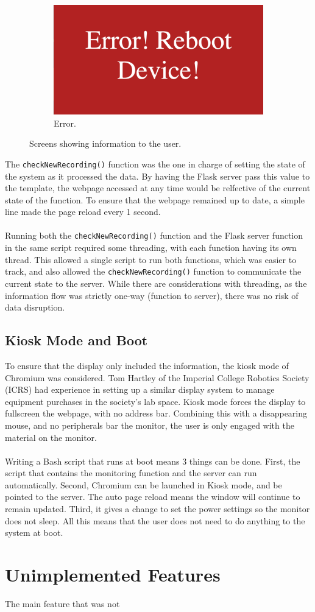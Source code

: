 \documentclass[main.tex]{subfiles}
\begin{document}
\begin{figure}[H]
\begin{subfigure}{0.45\textwidth}
				\includegraphics[width=\textwidth]{pics/state9}
				\caption{Error.}
				\label{fig:state9}
		\end{subfigure}
	\caption{Screens showing information to the user.}
	\label{fig:statesmore}
\end{figure}

The \texttt{checkNewRecording()} function was the one in charge of setting the state of the system as it processed the data. By having the Flask server pass this value to the template, the webpage accessed at any time would be relfective of the current state of the function. To ensure that the webpage remained up to date, a simple line made the page reload every 1 second.
\\\\
Running both the \texttt{checkNewRecording()} function and the Flask server function in the same script required some threading, with each function having its own thread. This allowed a single script to run both functions, which was easier to track, and also allowed the \texttt{checkNewRecording()} function to communicate the current state to the server. While there are considerations with threading, as the information flow was strictly one-way (function to server), there was no risk of data disruption.

\subsection{Kiosk Mode and Boot}
To ensure that the display only included the information, the kiosk mode of Chromium was considered. Tom Hartley of the Imperial College Robotics Society (ICRS) had experience in setting up a similar display system to manage equipment purchases in the society's lab space. Kiosk mode forces the display to fullscreen the webpage, with no address bar. Combining this with a disappearing mouse, and no peripherals bar the monitor, the user is only engaged with the material on the monitor.
\\\\
Writing a Bash script that runs at boot means 3 things can be done. First, the script that contains the monitoring function and the server can run automatically. Second, Chromium can be launched in Kiosk mode, and be pointed to the server. The auto page reload means the window will continue to remain updated. Third, it gives a change to set the power settings so the monitor does not sleep. All this means that the user does not need to do anything to the system at boot.

\section{Unimplemented Features}
The main feature that was not
\end{document}
